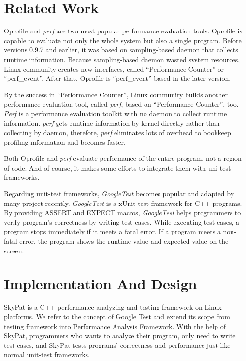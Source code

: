 \documentclass[final]{ols}
\begin{document}
\section{Related Work}

Oprofile\cite{oprofile} and \textit{perf} are two most popular performance evaluation tools.
Oprofile is capable to evaluate not only the whole system but also a single program.
Before versions 0.9.7 and earlier, it was based on sampling-based daemon that collects runtime information.
Because sampling-based daemon wasted system resources, Linux community creates new interfaces, called ``Performance Counter''\cite{performance-counter-linux} or ``perf\_event''.
After that, Oprofile is ``perf\_event''-based in the later version.

By the success in ``Performance Counter'', Linux community builds another performance evaluation tool, called \textit{perf}, based on ``Performance Counter'', too.
\textit{Perf} is a performance evaluation toolkit with no daemon to collect runtime information.
\textit{perf} gets runtime information by kernel directly rather than collecting by daemon, therefore, \textit{perf} eliminates lots of overhead to bookkeep profiling information and becomes faster.

Both Oprofile and \textit{perf} evaluate performance of the entire program, not a region of code.
And of course, it makes some efforts to integrate them with uni-test frameworks.

Regarding unit-test frameworks, \textit{GoogleTest} becomes popular and adapted by many project recently.
\textit{GoogleTest} is a xUnit test framework for C++ programs.
By providing ASSERT and EXPECT macros, \textit{GoogleTest} helps programmers to verify program's correctness by writing test-cases.
While executing test-cases, a program stops immediately if it meets a fatal error.
If a program meets a non-fatal error, the program shows the runtime value and expected value on the screen.

\section{Implementation And Design}

SkyPat is a C++ performance analyzing and testing framework on Linux platforms.
We refer to the concept of Google Test and extend its scope from testing framework into Performance Analysis Framework.
With the help of SkyPat, programmers who wants to analyze their program, only need to write test cases, and SkyPat tests programs' correctness and performance just like normal unit-test frameworks.
\end{document}
